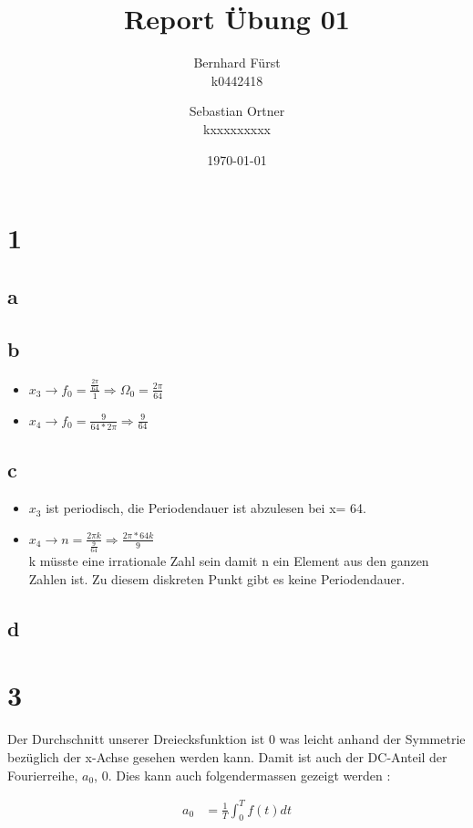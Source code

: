 \documentclass{article}
\author{ Bernhard Fürst \\ k0442418 \and Sebastian Ortner \\ kxxxxxxxxx}
\title{Report Übung 01}
\date{\today}
\begin{document}
    \maketitle
    \section*{1}
    \subsection*{a}
    \subsection*{b}
    \begin{itemize}
        \item $x_3 \rightarrow f_0 = \frac{\frac{2\pi}{64}}{1} \Rightarrow  \Omega_0 = \frac{2\pi}{64}$
        \item $x_4 \rightarrow f_0 = \frac{9}{64*2\pi} \Rightarrow \frac{9}{64}$
    \end{itemize}
    \subsection*{c}
    \begin{itemize}
        \item $x_3$ ist periodisch, die Periodendauer ist abzulesen bei x= 64.
        \item $x_4 \rightarrow n = \frac{2\pi k}{\frac{9}{64}}\Rightarrow \frac{2\pi * 64 k}{9}$ \\k müsste eine irrationale Zahl sein damit n ein Element aus den ganzen Zahlen ist. Zu diesem diskreten Punkt gibt es keine Periodendauer. 
    \end{itemize}
    \subsection*{d}
    \section*{3}
    Der Durchschnitt unserer Dreiecksfunktion ist $0$ was leicht anhand der Symmetrie bezüglich der x-Achse gesehen werden kann. Damit ist auch der DC-Anteil der Fourierreihe, $a_0$, $0$.
    Dies kann auch folgendermassen gezeigt werden :
    
    \begin{eqnarray*}
        a_{0} &=\frac{1}{T}\int_{0}^{T}f(t)dt 
    \end{eqnarray*}
\end{document}
